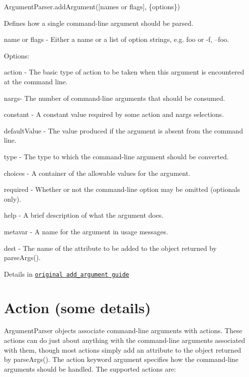 \begin{DoxyCode}
ArgumentParser.addArgument([names or flags], \{options\})
\end{DoxyCode}


Defines how a single command-\/line argument should be parsed.


\begin{DoxyItemize}
\item {\ttfamily name or flags} -\/ Either a name or a list of option strings, e.\+g. foo or -\/f, --foo.
\end{DoxyItemize}

Options\+:


\begin{DoxyItemize}
\item {\ttfamily action} -\/ The basic type of action to be taken when this argument is encountered at the command line.
\item {\ttfamily nargs}-\/ The number of command-\/line arguments that should be consumed.
\item {\ttfamily constant} -\/ A constant value required by some action and nargs selections.
\item {\ttfamily default\+Value} -\/ The value produced if the argument is absent from the command line.
\item {\ttfamily type} -\/ The type to which the command-\/line argument should be converted.
\item {\ttfamily choices} -\/ A container of the allowable values for the argument.
\item {\ttfamily required} -\/ Whether or not the command-\/line option may be omitted (optionals only).
\item {\ttfamily help} -\/ A brief description of what the argument does.
\item {\ttfamily metavar} -\/ A name for the argument in usage messages.
\item {\ttfamily dest} -\/ The name of the attribute to be added to the object returned by parse\+Args().
\end{DoxyItemize}

Details in \href{http://docs.python.org/dev/library/argparse.html#the-add-argument-method}{\tt original add\+\_\+argument guide}

\section*{Action (some details) }

Argument\+Parser objects associate command-\/line arguments with actions. These actions can do just about anything with the command-\/line arguments associated with them, though most actions simply add an attribute to the object returned by parse\+Args(). The action keyword argument specifies how the command-\/line arguments should be handled. The supported actions are\+:


